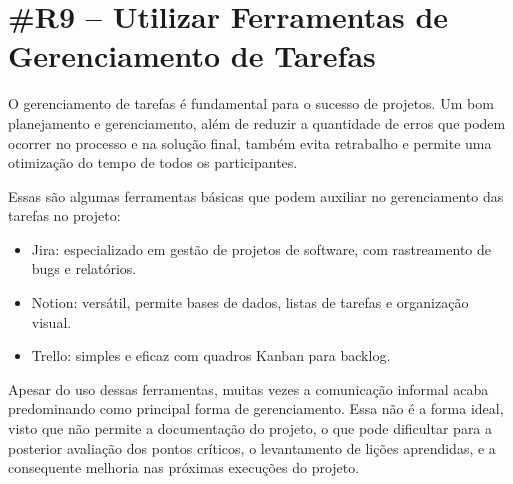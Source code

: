 \section*{\#R9 – Utilizar Ferramentas de Gerenciamento de Tarefas}

O gerenciamento de tarefas é fundamental para o sucesso de projetos. Um bom planejamento e gerenciamento, além de reduzir a quantidade de erros que podem ocorrer no processo e na solução final, também evita retrabalho e permite uma otimização do tempo de todos os participantes.

Essas são algumas ferramentas básicas que podem auxiliar no gerenciamento das tarefas no projeto:

\begin{itemize}
    \item Jira: especializado em gestão de projetos de software, com rastreamento de bugs e relatórios.
    \item Notion: versátil, permite bases de dados, listas de tarefas e organização visual.
    \item Trello: simples e eficaz com quadros Kanban para backlog.
\end{itemize}

Apesar do uso dessas ferramentas, muitas vezes a comunicação informal acaba predominando como principal forma de gerenciamento. Essa não é a forma ideal, visto que não permite a documentação do projeto, o que pode dificultar para a posterior avaliação dos pontos críticos, o levantamento de lições aprendidas, e a consequente melhoria nas próximas execuções do projeto.